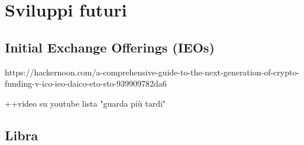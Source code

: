 \chapter{Sviluppi futuri}
\section{Initial Exchange Offerings (IEOs)}

https://hackernoon.com/a-comprehensive-guide-to-the-next-generation-of-crypto-funding-v-ico-ieo-daico-eto-sto-939909782da6

++video su youtube lista "guarda più tardi"
\section{Libra}